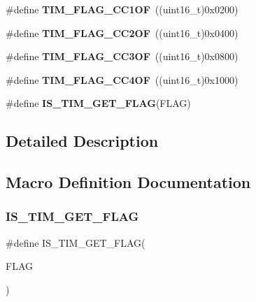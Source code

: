 \begin{DoxyCompactItemize}
\#define {\bfseries T\+I\+M\+\_\+\+F\+L\+A\+G\+\_\+\+C\+C1\+OF}~((uint16\+\_\+t)0x0200)
\item 
\mbox{\label{group___t_i_m___flags_ga4df0c71d3e695c214d49802942e04590}} 
\#define {\bfseries T\+I\+M\+\_\+\+F\+L\+A\+G\+\_\+\+C\+C2\+OF}~((uint16\+\_\+t)0x0400)
\item 
\mbox{\label{group___t_i_m___flags_gac81f24eaffdf83c2db9d2e6078a00919}} 
\#define {\bfseries T\+I\+M\+\_\+\+F\+L\+A\+G\+\_\+\+C\+C3\+OF}~((uint16\+\_\+t)0x0800)
\item 
\mbox{\label{group___t_i_m___flags_gafc8b04654766d98ba2c6fed601895a20}} 
\#define {\bfseries T\+I\+M\+\_\+\+F\+L\+A\+G\+\_\+\+C\+C4\+OF}~((uint16\+\_\+t)0x1000)
\item 
\#define {\bfseries I\+S\+\_\+\+T\+I\+M\+\_\+\+G\+E\+T\+\_\+\+F\+L\+AG}(F\+L\+AG)
\end{DoxyCompactItemize}


\subsection{Detailed Description}


\subsection{Macro Definition Documentation}
\mbox{\label{group___t_i_m___flags_ga6406de8131ae53ee29740c3e8627b098}} 
\subsubsection{\texorpdfstring{I\+S\+\_\+\+T\+I\+M\+\_\+\+G\+E\+T\+\_\+\+F\+L\+AG}{IS\_TIM\_GET\_FLAG}}
{\footnotesize\ttfamily \#define I\+S\+\_\+\+T\+I\+M\+\_\+\+G\+E\+T\+\_\+\+F\+L\+AG(\begin{DoxyParamCaption}\item[{}]{F\+L\+AG }\end{DoxyParamCaption})}

